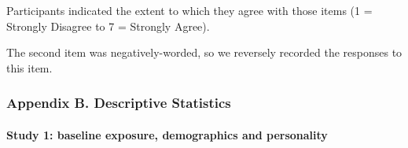 \documentclass[
  singlecolumn,
  9pt]{article}
\let\oldparagraph\paragraph
\renewcommand{\paragraph}[1]{\oldparagraph{#1}\mbox{}}
\begin{document}
Participants indicated the extent to which they agree with those items
(1 = Strongly Disagree to 7 = Strongly Agree).

The second item was negatively-worded, so we reversely recorded the
responses to this item.

\newpage{}

\subsubsection{Appendix B. Descriptive
Statistics}\label{appendix-b.-descriptive-statistics}

\paragraph{Study 1: baseline exposure, demographics and
personality}\label{study-1-baseline-exposure-demographics-and-personality}
\end{document}
